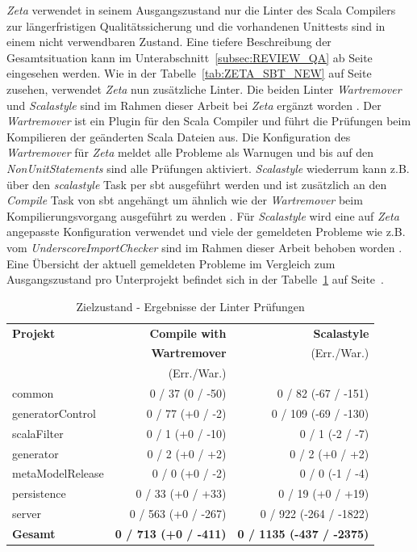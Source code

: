 \textit{Zeta} verwendet in seinem Ausgangszustand nur die Linter des Scala Compilers zur längerfristigen Qualitätssicherung und die vorhandenen Unittests sind in einem nicht verwendbaren Zustand. Eine tiefere Beschreibung der Gesamtsituation kann im Unterabschnitt~\ref{subsec:REVIEW_QA} ab Seite~\pageref{subsec:REVIEW_QA} eingesehen werden. Wie in der Tabelle~\ref{tab:ZETA_SBT_NEW} auf Seite~\pageref{tab:ZETA_SBT_NEW} zusehen, verwendet \textit{Zeta} nun zusätzliche Linter. Die beiden Linter \textit{Wartremover} und \textit{Scalastyle} sind im Rahmen dieser Arbeit bei \textit{Zeta} ergänzt worden \cite{zeta_commit_linter,wartremover,scalastyle}. Der \textit{Wartremover} ist ein Plugin für den Scala Compiler und führt die Prüfungen beim Kompilieren der geänderten Scala Dateien aus. Die Konfiguration des \textit{Wartremover} für \textit{Zeta} meldet alle Probleme als Warnugen und bis auf den \textit{NonUnitStatements} sind alle Prüfungen aktiviert. \textit{Scalastyle} wiederrum kann z.B. über den \textit{scalastyle} Task per \ac{sbt} ausgeführt werden und ist zusätzlich an den \textit{Compile} Task von \ac{sbt} angehängt um ähnlich wie der \textit{Wartremover} beim Kompilierungsvorgang ausgeführt zu werden \cite{zeta_new_build}. Für \textit{Scalastyle} wird eine auf \textit{Zeta} angepasste Konfiguration verwendet und viele der gemeldeten Probleme wie z.B. vom \textit{UnderscoreImportChecker} sind im Rahmen dieser Arbeit behoben worden \cite{zeta_new_scalastyle,zeta_commit_UnderscoreImport}. Eine Übersicht der aktuell gemeldeten Probleme im Vergleich zum Ausgangszustand pro Unterprojekt befindet sich in der Tabelle~\ref{tab:ZETA_METRICS_LINT_NEW} auf Seite~\pageref{tab:ZETA_METRICS_LINT_NEW}.

\begin{table}[ht]
    \smallskip
    \centering
    \begin{tabular}{| l | r | r |}
    \hline
    \bf Projekt & \bf Compile with & \bf Scalastyle \\ 
    ~ & \bf Wartremover & (Err./War.) \\ 
    ~ & (Err./War.) & ~ \\ \hline
    common & 0 / 37 (0 / -50) & 0 / 82 (-67 / -151) \\ \hline
    generatorControl & 0 / 77 (+0 / -2) & 0 / 109 (-69 / -130) \\ \hline
    scalaFilter & 0 / 1 (+0 / -10) & 0 / 1 (-2 / -7) \\ \hline
    generator & 0 / 2 (+0 / +2) & 0 / 2 (+0 / +2) \\ \hline
    metaModelRelease & 0 / 0 (+0 / -2) & 0 / 0 (-1 / -4) \\ \hline
    persistence & 0 / 33 (+0 / +33) & 0 / 19 (+0 / +19) \\ \hline
    server & 0 / 563 (+0 / -267) & 0 / 922 (-264 / -1822) \\ \hline
    \bf Gesamt & \bf 0 / 713 (+0 / -411) & \bf 0 / 1135 (-437 / -2375) \\ \hline
    \end{tabular}
    \caption{Zielzustand - Ergebnisse der Linter Prüfungen \cite[Scalastyle]{analys_new}}
    \label{tab:ZETA_METRICS_LINT_NEW}
\end{table}


